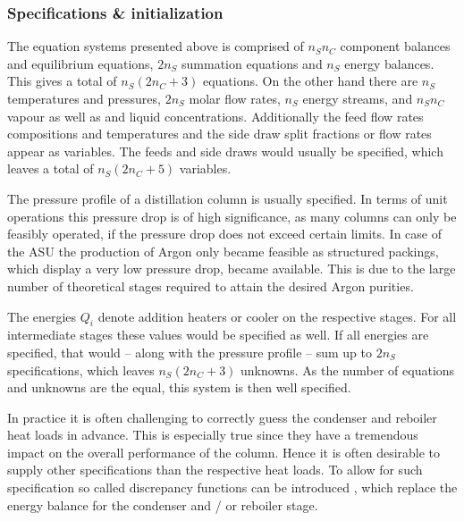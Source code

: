     \subsubsection{Specifications \& initialization}
    \label{sec:mathpro:steady:specinit}
        The equation systems presented above is comprised of $n_S n_C$ component balances and equilibrium
        equations, $2n_S$ summation equations and $n_S$ energy balances. This gives a total of $n_S (2n_C + 3)$
        equations. On the other hand there are $n_S$ temperatures and pressures, $2n_S$ molar flow rates,
        $n_S$ energy streams, and $n_S n_C$ vapour as well as and liquid concentrations. Additionally the feed flow rates
        compositions and temperatures and the side draw split fractions or flow rates appear as variables. The
        feeds and side draws would usually be specified, which leaves a total of $n_S (2n_C + 5)$ variables.

        The pressure profile of a distillation column is usually specified.
        In terms of unit operations this pressure drop is of high significance,
        as many columns can only be feasibly operated, if the pressure drop does not exceed certain
        limits. In case of the ASU the production of Argon only became feasible as structured
        packings, which display a very low pressure drop, became available. This is due to the large
        number of theoretical stages required to attain the desired Argon purities.

        The energies $Q_i$ denote addition heaters or cooler on the respective stages. For all
        intermediate stages these values would be specified as well. If all energies are
        specified, that would -- along with the pressure profile -- sum up to $2 n_S$ specifications,
        which leaves $n_S (2n_C + 3)$ unknowns. As the number of equations and unknowns are the equal,
        this system is then well specified.

        In practice it is often challenging to correctly guess the condenser and reboiler heat loads in
        advance. This is especially true since they have a tremendous impact on the overall performance
        of the column. Hence it is often desirable to supply other specifications than the respective
        heat loads. To allow for such specification so called discrepancy functions can be introduced
        \cite{Henley.op.2011}, which replace the energy balance for the condenser and / or reboiler stage.

